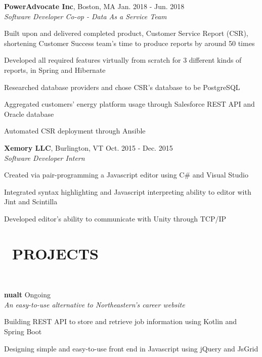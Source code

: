 \documentclass[11pt]{res}
\newcommand{\sectionunderline}{\vspace{-3mm}\hrulefill\\}
\newcommand{\newsect}[1]{\section{\Large \bf #1}}
\begin{document}
\begin{resume}
{{      {\bf PowerAdvocate Inc}, Boston, MA \hfill Jan. 2018 - Jun. 2018\\
      {\it Software Developer Co-op - Data As a Service Team}
      \begin{itemize}
        {\item Built upon and delivered completed product, Customer Service Report (CSR), shortening Customer Success team's time to produce reports by around 50 times}
        {\item Developed all required features virtually from scratch for 3 different kinds of reports, in Spring and Hibernate}
        {\item Researched database providers and chose CSR's database to be PostgreSQL}
        {\item Aggregated customers' energy platform usage through Salesforce REST API and Oracle database}
        {\item Automated CSR deployment through Ansible}
      \end{itemize}

      {\bf Xemory LLC}, Burlington, VT \hfill Oct. 2015 - Dec. 2015\\
      {\it Software Developer Intern}
      \begin{itemize}
        {\item Created via pair-programming a Javascript editor using C\# and Visual Studio}
        {\item Integrated syntax highlighting and Javascript interpreting ability to editor with Jint and Scintilla}
        {\item Developed editor's ability to communicate with Unity through TCP/IP}
      \end{itemize}
    }
  }

  \newsect{\faGithubAlt\ PROJECTS}{
    \sectionunderline{
      {\bf nualt} \hfill Ongoing\\
      {\it An easy-to-use alternative to Northeastern's career website}
      \begin{itemize}
        {\item {}}
        {\item Building REST API to store and retrieve job information using Kotlin and Spring Boot}
        {\item Designing simple and easy-to-use front end in Javascript using jQuery and JsGrid}
      \end{itemize}
    }
  }
\end{resume}
\end{document}
